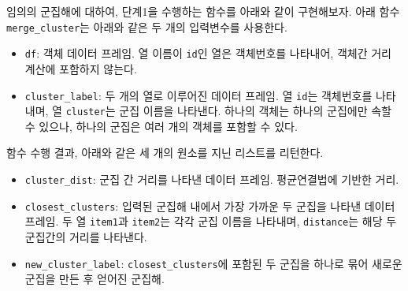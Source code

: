 \documentclass[
]{book}
\providecommand{\tightlist}{%
  \setlength{\itemsep}{0pt}\setlength{\parskip}{0pt}}
\begin{document}
임의의 군집해에 대하여, 단계1을 수행하는 함수를 아래와 같이 구현해보자. 아래 함수 \texttt{merge\_cluster}는 아래와 같은 두 개의 입력변수를 사용한다.

\begin{itemize}
\tightlist
\item
  \texttt{df}: 객체 데이터 프레임. 열 이름이 \texttt{id}인 열은 객체번호를 나타내어, 객체간 거리 계산에 포함하지 않는다.
\item
  \texttt{cluster\_label}: 두 개의 열로 이루어진 데이터 프레임. 열 \texttt{id}는 객체번호를 나타내며, 열 \texttt{cluster}는 군집 이름을 나타낸다. 하나의 객체는 하나의 군집에만 속할 수 있으나, 하나의 군집은 여러 개의 객체를 포함할 수 있다.
\end{itemize}

함수 수행 결과, 아래와 같은 세 개의 원소를 지닌 리스트를 리턴한다.

\begin{itemize}
\tightlist
\item
  \texttt{cluster\_dist}: 군집 간 거리를 나타낸 데이터 프레임. 평균연결법에 기반한 거리.
\item
  \texttt{closest\_clusters}: 입력된 군집해 내에서 가장 가까운 두 군집을 나타낸 데이터 프레임. 두 열 \texttt{item1}과 \texttt{item2}는 각각 군집 이름을 나타내며, \texttt{distance}는 해당 두 군집간의 거리를 나타낸다.
\item
  \texttt{new\_cluster\_label}: \texttt{closest\_clusters}에 포함된 두 군집을 하나로 묶어 새로운 군집을 만든 후 얻어진 군집해.
\end{itemize}
\end{document}
